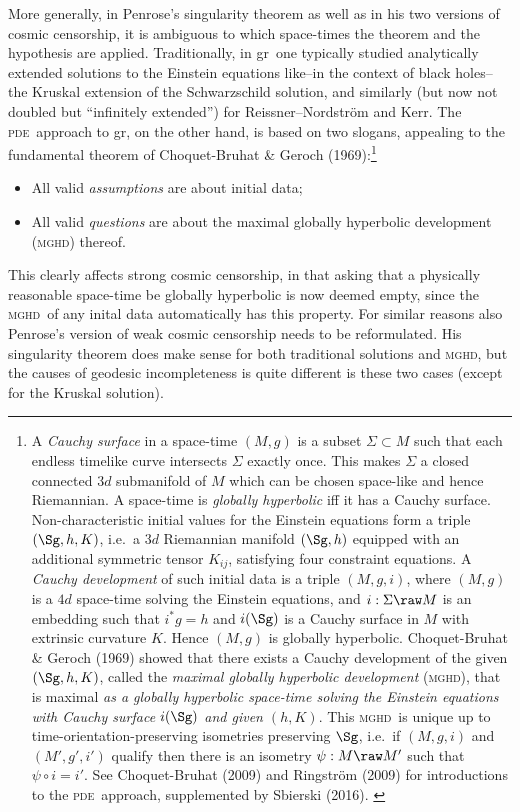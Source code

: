 \documentclass[11pt,a4paper]{article}
\newcommand{\mghd}{\textsc{mghd}}
\newcommand{\pde}{\textsc{pde}}
\newcommand{\GR}{{\sc gr}}
\begin{document}
More generally, in Penrose's singularity theorem as well as in his two versions of cosmic censorship, 
  it is ambiguous to which space-times the theorem and the hypothesis are applied. Traditionally, in  \GR\ one typically studied
analytically extended solutions to the Einstein equations like--in the context of black holes--the Kruskal extension of the Schwarzschild solution, and similarly (but now not doubled but ``infinitely extended'') for  Reissner--Nordstr\"{o}m and Kerr.
 The  \pde\ approach to \GR, on the other hand,  is based on two slogans, appealing to the fundamental theorem of Choquet-Bruhat \& Geroch (1969):\footnote{A \emph{Cauchy surface} in a space-time $(M,g)$ is a subset $\Sigma\subset M$ such that each endless timelike curve intersects $\Sigma$  exactly once. This makes $\Sigma$ a closed connected $3d$ submanifold of $M$ which can  be chosen space-like and hence Riemannian. 
 A space-time is \emph{globally hyperbolic} iff it has a Cauchy surface. 
 Non-characteristic initial values for the Einstein equations form a triple $(\Sg,h,K)$, i.e.\  a $3d$
 Riemannian manifold  $(\Sg,h)$ equipped with an additional symmetric tensor  $K_{ij}$, satisfying four constraint equations.
 A \emph{Cauchy development} of such initial data is a triple $(M,g,i)$,  where $(M,g)$ is a $4d$ space-time solving the Einstein equations, and $i:\Sigma\raw M$ is an embedding such that $i^*g=h$ and $i(\Sg)$ is a Cauchy surface in $M$ with  extrinsic curvature  $K$. Hence $(M,g)$ is globally hyperbolic.  Choquet-Bruhat \& Geroch (1969) showed that 
 there exists a  Cauchy development of the given $(\Sg,h,K)$, called the
 \emph{maximal  globally hyperbolic development} (\mghd), that is maximal \emph{as a globally hyperbolic space-time solving the  Einstein equations with Cauchy surface $i(\Sg)$ and given  $(h,K)$}. This \mghd\ is unique up to time-orientation-preserving isometries preserving $\Sg$, i.e.\ if $(M,g,i)$ and $(M',g',i')$ qualify then there is an isometry $\psi:M\raw M'$ such that $\psi\circ i=i'$. See Choquet-Bruhat (2009) and Ringstr\"{o}m (2009) for introductions to the \pde\ approach, supplemented by Sbierski (2016). 
 \label{CGBfn}
 }
\begin{itemize}
\item All valid \emph{assumptions} are  about  initial data;
\item All valid \emph{questions} are  about the maximal  globally hyperbolic development (\mghd) thereof. 
\end{itemize}
This clearly affects strong cosmic censorship, in that  asking that a physically reasonable space-time be globally hyperbolic is now deemed empty,
 since the \mghd\ of any inital data automatically has this property.  
For similar reasons also Penrose's version of weak cosmic censorship needs to be reformulated. His singularity theorem does make sense for both traditional solutions and \mghd, but the causes of geodesic incompleteness is quite different is these two cases (except for the Kruskal solution).
\end{document}
